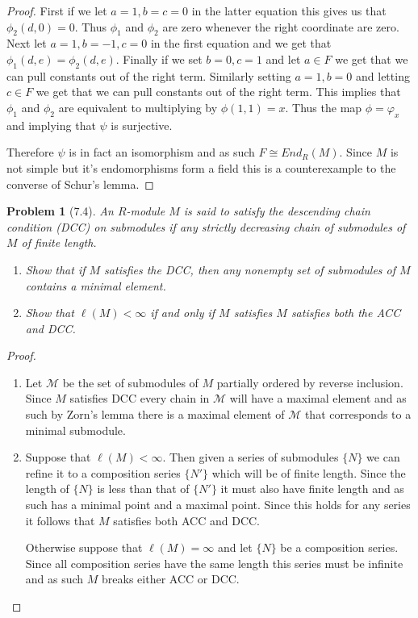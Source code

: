 \documentclass[10pt]{article}
\newcommand{\sk}{\vskip 10mm}
\theoremstyle{plain}
\newtheorem{problem}{Problem}
\theoremstyle{remark}
\begin{document}
\begin{proof}
  First if we let $a=1,b=c=0$ in the latter equation this gives us that
  $\phi_2(d,0)=0$. Thus $\phi_1$ and $\phi_2$ are zero whenever the right coordinate
  are zero. Next let $a=1,b=-1,c=0$ in the first equation and we get that
  $\phi_1(d,e)=\phi_2(d,e)$. Finally if we set $b=0,c=1$ and let $a\in F$ we
  get that we can pull constants out of the right term. Similarly
  setting $a=1,b=0$ and letting $c\in F$ we get that we can pull constants
  out of the right term. This implies that $\phi_1$ and $\phi_2$ are equivalent to
  multiplying by $\phi(1,1)=x$. Thus the map $\phi=\varphi_x$ and implying that $\psi$ is
  surjective.

  Therefore $\psi$ is in fact an isomorphism and as such $F\cong End_R(M)$.
  Since $M$ is not simple but it's endomorphisms form a field this
  is a counterexample to the converse of Schur's lemma.
\end{proof}

\sk

\begin{problem}[7.4]
  An $R$-module $M$ is said to satisfy the descending chain condition (DCC)
  on submodules if any strictly decreasing chain of submodules of $M$ of
  finite length.
  \begin{enumerate}
  \item[(a)] Show that if $M$ satisfies the DCC, then any nonempty set
    of submodules of $M$ contains a minimal element.
  \item[(b)] Show that $\ell(M)<\infty$ if and only if $M$ satisfies $M$
    satisfies both the ACC and DCC.
  \end{enumerate}
\end{problem}

\begin{proof}
  \begin{enumerate}
  \item[(a)] Let $\mathcal{M}$ be the set of submodules of $M$ partially
    ordered by reverse inclusion. Since $M$ satisfies DCC every chain
    in $\mathcal{M}$ will have a maximal element and as such
    by Zorn's lemma there is a maximal element of $\mathcal{M}$ that
    corresponds to a minimal submodule.
  \item[(b)] Suppose that $\ell(M)<\infty$. Then given a series of submodules
    $\{N\}$ we can refine it to a composition series $\{N'\}$ which
    will be of finite length. Since the length of $\{N\}$ is less
    than that of $\{N'\}$ it must also have finite length and as
    such has a minimal point and a maximal point. Since
    this holds for any series it follows that $M$ satisfies
    both ACC and DCC.

    Otherwise suppose that $\ell(M)=\infty$ and let $\{ N\}$ be a composition
    series. Since all composition series have the same length
    this series must be infinite and as such $M$ breaks either
    ACC or DCC.
  \end{enumerate}
\end{proof}
\end{document}
